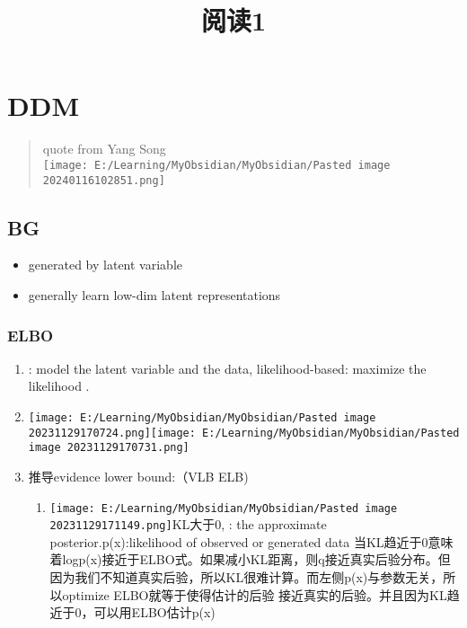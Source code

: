 \documentclass[
]{article}
\title{阅读1}
\author{}
\date{}
\providecommand{\tightlist}{%
  \setlength{\itemsep}{0pt}\setlength{\parskip}{0pt}}
\begin{document}
\maketitle

\section{DDM}\label{ddm}

\begin{quote}
quote from Yang Song\\
\texttt{[image: E:/Learning/MyObsidian/MyObsidian/Pasted image 20240116102851.png]}
\end{quote}

\subsection{BG}\label{bg}

\begin{itemize}
\tightlist
\item
  generated by latent variable {}
\item
  generally learn low-dim latent representations
\end{itemize}

\subsubsection{ELBO}\label{elbo}

\begin{enumerate}
\item
  {}: model the latent variable and the data, likelihood-based: maximize
  the likelihood {}.
\item
  \texttt{[image: E:/Learning/MyObsidian/MyObsidian/Pasted image 20231129170724.png]}\texttt{[image: E:/Learning/MyObsidian/MyObsidian/Pasted image 20231129170731.png]}
\item
  推导evidence lower bound:（VLB ELB)

  \begin{enumerate}
  \tightlist
  \item
    \texttt{[image: E:/Learning/MyObsidian/MyObsidian/Pasted image 20231129171149.png]}KL大于0,
    {}: the approximate posterior.p(x):likelihood of observed or
    generated data
    当KL趋近于0意味着logp(x)接近于ELBO式。如果减小KL距离，则q接近真实后验分布。但因为我们不知道真实后验，所以KL很难计算。而左侧p(x)与参数{}无关，所以optimize
    ELBO就等于使得估计的后验
    接近真实的后验。并且因为KL趋近于0，可以用ELBO估计p(x)
  \end{enumerate}
\end{enumerate}
\end{document}
